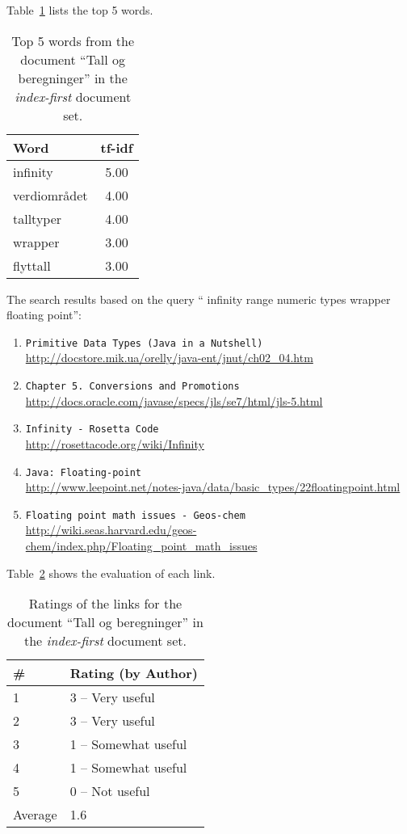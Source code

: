 Table~\ref{tab:topWords-no-tall-og-beregninger} lists the top 5 words.
\begin{table}[H]
\centering
\begin{tabular}{|l|c|}
\hline\hline
    Word & tf-idf \\
\hline
    infinity & 5.00 \\
    verdiområdet & 4.00 \\
    talltyper & 4.00 \\
    wrapper & 3.00 \\
    flyttall & 3.00 \\
\hline\hline
\end{tabular}
\caption{Top 5 words from the document ``Tall og beregninger'' in the \textit{index-first} document set.}
\label{tab:topWords-no-tall-og-beregninger}
\end{table}

The search results based on the query `` infinity range numeric types wrapper floating point'':

\begin{enumerate}
\item
    \verb|Primitive Data Types (Java in a Nutshell)| \\
    \url{http://docstore.mik.ua/orelly/java-ent/jnut/ch02_04.htm}
\item
    \verb|Chapter 5. Conversions and Promotions| \\
    \url{http://docs.oracle.com/javase/specs/jls/se7/html/jls-5.html}
\item
    \verb|Infinity - Rosetta Code| \\
    \url{http://rosettacode.org/wiki/Infinity}
\item
    \verb|Java: Floating-point| \\
    \url{http://www.leepoint.net/notes-java/data/basic_types/22floatingpoint.html}
\item
    \verb|Floating point math issues - Geos-chem| \\
    \url{http://wiki.seas.harvard.edu/geos-chem/index.php/Floating_point_math_issues}
\end{enumerate}

Table~\ref{tab:ratings-no-tall-og-beregninger} shows the evaluation of each link.
\begin{table}[H]
\centering
\begin{tabular}{|l|l|}
\hline\hline
    \# & Rating (by Author) \\
\hline
    1 & 3 -- Very useful \\
    2 & 3 -- Very useful \\
    3 & 1 -- Somewhat useful \\
    4 & 1 -- Somewhat useful \\
    5 & 0 -- Not useful \\
\hline
    Average & 1.6 \\
\hline\hline
\end{tabular}
\caption{Ratings of the links for the document ``Tall og beregninger'' in the \textit{index-first} document set.}
\label{tab:ratings-no-tall-og-beregninger}
\end{table}